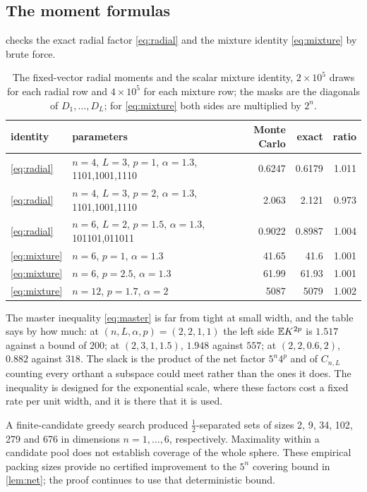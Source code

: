 \subsection{The moment formulas}

 checks the exact radial factor \cref{eq:radial} and the mixture identity \cref{eq:mixture} by brute force.

\begin{table}[h]\centering\small
\begin{tabular}{llrrr}
\toprule
identity & parameters & Monte Carlo & exact & ratio\\
\midrule
\cref{eq:radial} & $n=4$, $L=3$, $p=1$, $\alpha=1.3$, 1101,1001,1110 & 0.6247 & 0.6179 & 1.011\\
\cref{eq:radial} & $n=4$, $L=3$, $p=2$, $\alpha=1.3$, 1101,1001,1110 & 2.063 & 2.121 & 0.973\\
\cref{eq:radial} & $n=6$, $L=2$, $p=1.5$, $\alpha=1.3$, 101101,011011 & 0.9022 & 0.8987 & 1.004\\
\cref{eq:mixture} & $n=6$, $p=1$, $\alpha=1.3$ & 41.65 & 41.6 & 1.001\\
\cref{eq:mixture} & $n=6$, $p=2.5$, $\alpha=1.3$ & 61.99 & 61.93 & 1.001\\
\cref{eq:mixture} & $n=12$, $p=1.7$, $\alpha=2$ & 5087 & 5079 & 1.002\\
\bottomrule
\end{tabular}
\caption{The fixed-vector radial moments and the scalar mixture identity, $2\times10^5$ draws for each radial row and $4\times10^5$ for each mixture row; the masks are the diagonals of $D_1,\dots,D_L$; for \cref{eq:mixture} both sides are multiplied by $2^n$.}
\label{tab:radial}
\end{table}

The master inequality \cref{eq:master} is far from tight at small width, and the table says by how much: at $(n,L,\alpha,p)=(2,2,1,1)$ the left side $\mathbb{E} K^{2p}$ is $1.517$ against a bound of $200$; at $(2,3,1,1.5)$, $1.948$ against $557$; at $(2,2,0.6,2)$, $0.882$ against $318$. The slack is the product of the net factor $5^n4^p$ and of $C_{n,L}$ counting every orthant a subspace could meet rather than the ones it does. The inequality is designed for the exponential scale, where these factors cost a fixed rate per unit width, and it is there that it is used.

A finite-candidate greedy search produced $\tfrac12$-separated sets of sizes 2, 9, 34, 102, 279 and 676 in dimensions $n=1,\dots,6$, respectively. Maximality within a candidate pool does not establish coverage of the whole sphere. These empirical packing sizes provide no certified improvement to the $5^n$ covering bound in \cref{lem:net}; the proof continues to use that deterministic bound.

